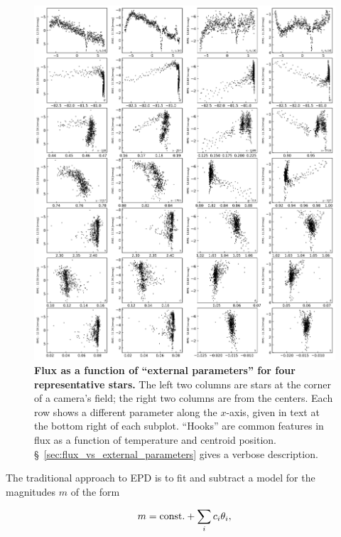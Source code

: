 \documentclass[12pt,twocolumn,tighten]{aastex62}
\begin{document}
\begin{figure}[t]
    \begin{center}
		\includegraphics[height=0.95\textheight]{f4.png}
    \end{center}
    \vspace{-0.8cm}
    \caption{
      {\bf Flux as a function of ``external parameters'' for four
      representative stars.} The left two columns are stars at the
      corner of a camera's field; the right two columns are from the
      centers.
      Each row shows a different parameter along the $x$-axis, given
      in text at the bottom right of each subplot.
      ``Hooks'' are common features in flux as a function of
      temperature and centroid position.
      \S~\ref{sec:flux_vs_external_parameters} gives a verbose
      description.
     \label{fig:flux_vs_external_parameters}
    }
\end{figure}

The traditional approach to EPD 
\citep[][]{Pal_2009,bakos_2010,zhang_precision_2016} is to fit and
subtract a model for the magnitudes $m$ of the form

\begin{equation}
  m = {\rm const.} + \sum_i c_i \theta_i,
  \label{eq:classical_EPD}
\end{equation}
\end{document}
